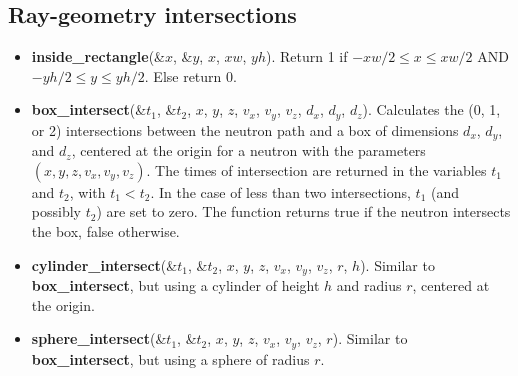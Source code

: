 \subsection{Ray-geometry intersections}
\begin{itemize}
\item {\bf inside\_rectangle}(\&$x$, \&$y$, $x$, $xw$, $yh$).
  Return 1 if $-xw/2 \leq x \leq xw/2$ AND $-yh/2 \leq y \leq yh/2$.
  Else return 0.
\item {\bf box\_intersect}(\&$t_1$, \&$t_2$, $x$, $y$, $z$, $v_x$, $v_y$, $v_z$,
  $d_x$, $d_y$, $d_z$). Calculates the (0, 1, or 2) intersections between
  the neutron path and a box of dimensions $d_x$, $d_y$, and $d_z$,
  centered at the origin for a neutron with the parameters
  $(x,y,z,v_x,v_y,v_z)$. The times of intersection are returned
  in the variables $t_1$ and $t_2$, with $t_1 < t_2$. In the case
  of less than two intersections, $t_1$ (and possibly $t_2$) are set to
  zero. The function returns true if the neutron intersects the box,
  false otherwise.
\item {\bf cylinder\_intersect}(\&$t_1$, \&$t_2$, $x$, $y$, $z$, $v_x$, $v_y$, $v_z$,
  $r$, $h$).  Similar to {\bf box\_intersect}, but using a cylinder of height $h$ and radius $r$,
  centered at the origin.
\item {\bf sphere\_intersect}(\&$t_1$, \&$t_2$, $x$, $y$, $z$, $v_x$, $v_y$, $v_z$,
  $r$). Similar to {\bf box\_intersect}, but using a sphere
  of radius $r$.
\end{itemize}


